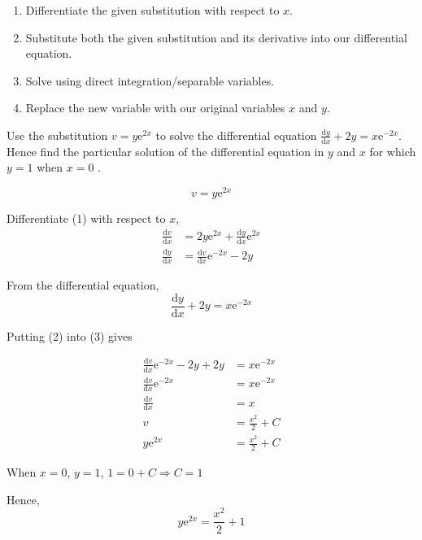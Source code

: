 \documentclass[11pt,a4paper]{book}
\begin{document}
\begin{tcolorbox}[colback=blue!5, colframe=black,boxrule=.4pt, sharpish corners]

\begin{enumerate}
\item Differentiate the given substitution with respect to $x$.
\item Substitute both the given substitution and its derivative into our
differential equation.
\item Solve using direct integration/separable variables.
\item Replace the new variable with our original variables $x$ and $y$.
\end{enumerate}
\end{tcolorbox}

\newpage{}

\begin{example}

Use the substitution $v=y\mathrm{e}^{2x}$ to solve the differential
equation ${\displaystyle \frac{\mathrm{d}y}{\mathrm{d}x}+2y=x\mathrm{e}^{-2x}}$.
Hence find the particular solution of the differential equation in
$y$ and $x$ for which $y=1$ when $x=0$ .

\Solution

\[
v=y\mathrm{e}^{2x}\tag{1}
\]

Differentiate (1) with respect to $x$,
\begin{align*}
\frac{\mathrm{d}v}{\mathrm{d}x} & =2y\mathrm{e}^{2x}+\frac{\mathrm{d}y}{\mathrm{d}x}\mathrm{e}^{2x}\\
\frac{\mathrm{d}y}{\mathrm{d}x} & =\frac{\mathrm{d}v}{\mathrm{d}x}\mathrm{e}^{-2x}-2y\tag{2}
\end{align*}

From the differential equation,
\[
\frac{\mathrm{d}y}{\mathrm{d}x}+2y=x\mathrm{e}^{-2x}\tag{3}
\]

Putting (2) into (3) gives

\begin{align*}
\frac{\mathrm{d}v}{\mathrm{d}x}\mathrm{e}^{-2x}-2y+2y & =x\mathrm{e}^{-2x}\\
\frac{\mathrm{d}v}{\mathrm{d}x}\mathrm{e}^{-2x} & =x\mathrm{e}^{-2x}\\
\frac{\mathrm{d}v}{\mathrm{d}x} & =x\\
v & =\frac{x^{2}}{2}+C\\
y\mathrm{e}^{2x} & =\frac{x^{2}}{2}+C
\end{align*}

When $x=0$, $y=1$, $1=0+C\Rightarrow C=1$

Hence,
\[
y\mathrm{e}^{2x}=\frac{x^{2}}{2}+1
\]

\end{example}
\end{document}
